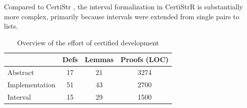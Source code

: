 Compared to CertiStr \cite{cpp/KanLRS22}, the interval formalization in CertiStrR is substantially more complex, primarily because intervals were extended from single pairs to lists.


\begin{table}[h]
  \centering
  \small
  \begin{tabular}{lccc}
      \toprule
      & \textbf{Defs} & \textbf{Lemmas} & \textbf{Proofs (LOC)} \\
      \midrule
      Abstract & 17 & 21 & 3274 \\
      Implementation & 51 & 43 & 2700 \\
      Interval & 15 & 29 & 1500 \\
      \bottomrule
  \end{tabular}
  \caption{Overview of the effort of certified development}
  \label{tab:abstract_impl}
\end{table}

